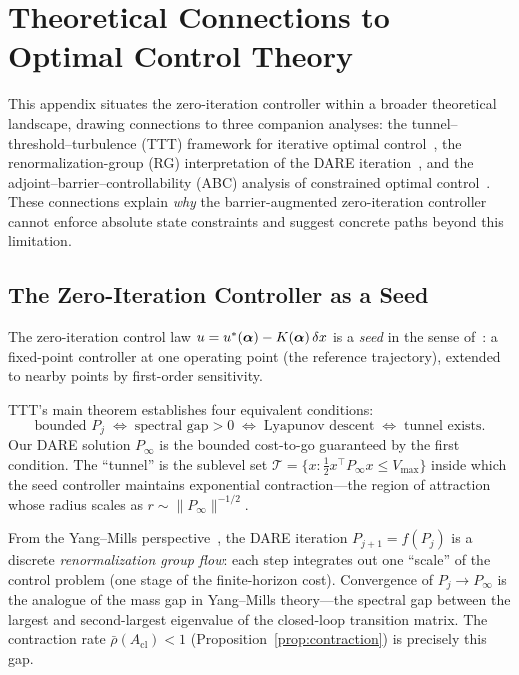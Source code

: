 \section{Theoretical Connections to Optimal Control Theory}
\label{sec:appendix_theory}

This appendix situates the zero-iteration controller within
a broader theoretical landscape, drawing connections to three
companion analyses: the tunnel--threshold--turbulence (TTT)
framework for iterative optimal control~\cite{zhang2026ttt},
the renormalization-group (RG) interpretation of the DARE
iteration~\cite{zhang2026ym}, and the adjoint--barrier--controllability
(ABC) analysis of constrained optimal control~\cite{zhang2026abc}.
These connections explain \emph{why} the barrier-augmented
zero-iteration controller cannot enforce absolute state constraints
and suggest concrete paths beyond this limitation.

\subsection{The Zero-Iteration Controller as a Seed}
\label{sec:seed}

The zero-iteration control law
$u = u^*(\bm{\alpha}) - K(\bm{\alpha})\,\delta x$
is a \emph{seed} in the sense of~\cite{zhang2026ttt}:
a fixed-point controller at one operating point
(the reference trajectory), extended to nearby points
by first-order sensitivity.

TTT's main theorem establishes four equivalent conditions:
\begin{equation}\label{eq:ttt_equiv}
  \text{bounded } P_j
  \;\Longleftrightarrow\;
  \text{spectral gap} > 0
  \;\Longleftrightarrow\;
  \text{Lyapunov descent}
  \;\Longleftrightarrow\;
  \text{tunnel exists.}
\end{equation}
Our DARE solution $P_\infty$ is the bounded cost-to-go
guaranteed by the first condition.
The ``tunnel'' is the sublevel set
$\mathcal{T} = \{x : \frac{1}{2} x^\top P_\infty x \leq V_{\max}\}$
inside which the seed controller maintains
exponential contraction---the region of attraction
whose radius scales as
$r \sim \|P_\infty\|^{-1/2}$.

From the Yang--Mills perspective~\cite{zhang2026ym},
the DARE iteration $P_{j+1} = f(P_j)$ is a discrete
\emph{renormalization group flow}: each step integrates
out one ``scale'' of the control problem
(one stage of the finite-horizon cost).
Convergence of $P_j \to P_\infty$ is the analogue
of the mass gap in Yang--Mills theory---the spectral gap
between the largest and second-largest eigenvalue of the
closed-loop transition matrix.
The contraction rate
$\bar\rho(A_{\mathrm{cl}}) < 1$ (Proposition~\ref{prop:contraction})
is precisely this gap.

